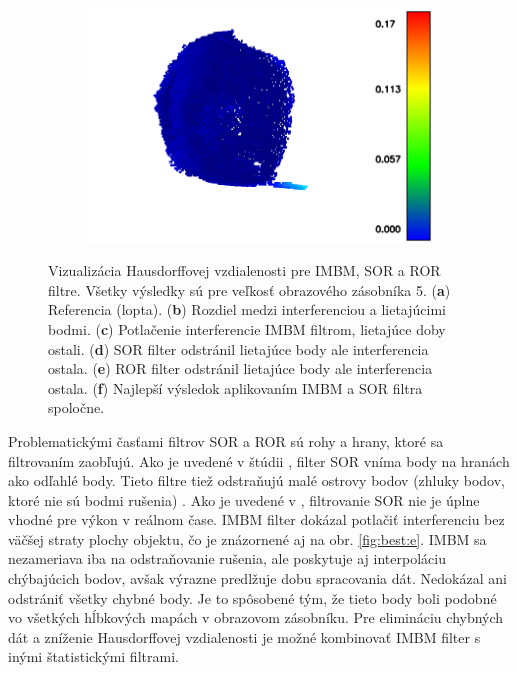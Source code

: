 \begin{figure}[h]
\begin{subfigure}[b]{0.3\textwidth}
		\includegraphics[width=\textwidth]{figures/ball_imbm_sor.png}
		\caption{}
		\label{fig:ball:f}
	\end{subfigure}
   \caption{Vizualizácia Hausdorffovej vzdialenosti pre IMBM, SOR a ROR filtre. Všetky výsledky sú pre veľkosť obrazového zásobníka 5. (\textbf{a}) Referencia (lopta). (\textbf{b}) Rozdiel medzi interferenciou a lietajúcimi bodmi. (\textbf{c}) Potlačenie interferencie IMBM filtrom, lietajúce doby ostali.  (\textbf{d}) SOR filter odstránil lietajúce body ale interferencia ostala.  (\textbf{e}) ROR filter odstránil lietajúce body ale interferencia ostala. (\textbf{f}) Najlepší výsledok aplikovaním IMBM a SOR filtra spoločne.}
\label{fig:ball}
\end{figure}

Problematickými časťami filtrov SOR a ROR sú rohy a hrany, ktoré sa filtrovaním zaobľujú. Ako je uvedené v štúdii \cite{Pirotti}, filter SOR vníma body na hranách ako odľahlé body. Tieto filtre tiež odstraňujú malé ostrovy bodov (zhluky bodov, ktoré nie sú bodmi rušenia) \cite{Schaller}. Ako je uvedené v \cite{Balta}, filtrovanie SOR nie je úplne vhodné pre výkon v reálnom čase. IMBM filter dokázal potlačiť interferenciu bez väčšej straty plochy objektu, čo je znázornené aj na obr. \ref{fig:best:e}. IMBM sa nezameriava iba na odstraňovanie rušenia, ale poskytuje aj interpoláciu chýbajúcich bodov, avšak výrazne predlžuje dobu spracovania dát. Nedokázal ani odstrániť všetky chybné body. Je to spôsobené tým, že tieto body boli podobné vo všetkých hĺbkových mapách v obrazovom zásobníku. Pre elimináciu chybných dát a zníženie Hausdorffovej vzdialenosti je možné kombinovať IMBM filter s inými štatistickými filtrami.

